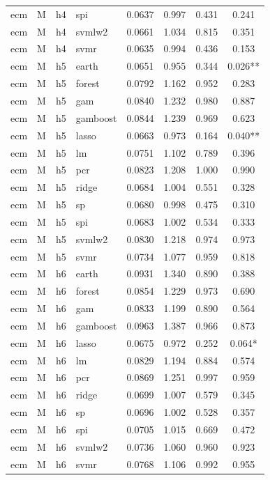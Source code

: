 \begin{ThreePartTable}
\begin{longtable}[t]{llclcccc}
ecm & M & h4 & spi & 0.0637 & 0.997 & 0.431 & 0.241\\
ecm & M & h4 & svmlw2 & 0.0661 & 1.034 & 0.815 & 0.351\\
ecm & M & h4 & svmr & 0.0635 & 0.994 & 0.436 & 0.153\\
\addlinespace
ecm & M & h5 & earth & 0.0651 & 0.955 & 0.344 & 0.026**\\
ecm & M & h5 & forest & 0.0792 & 1.162 & 0.952 & 0.283\\
ecm & M & h5 & gam & 0.0840 & 1.232 & 0.980 & 0.887\\
ecm & M & h5 & gamboost & 0.0844 & 1.239 & 0.969 & 0.623\\
ecm & M & h5 & lasso & 0.0663 & 0.973 & 0.164 & 0.040**\\
ecm & M & h5 & lm & 0.0751 & 1.102 & 0.789 & 0.396\\
ecm & M & h5 & pcr & 0.0823 & 1.208 & 1.000 & 0.990\\
ecm & M & h5 & ridge & 0.0684 & 1.004 & 0.551 & 0.328\\
ecm & M & h5 & sp & 0.0680 & 0.998 & 0.475 & 0.310\\
ecm & M & h5 & spi & 0.0683 & 1.002 & 0.534 & 0.333\\
ecm & M & h5 & svmlw2 & 0.0830 & 1.218 & 0.974 & 0.973\\
ecm & M & h5 & svmr & 0.0734 & 1.077 & 0.959 & 0.818\\
\addlinespace
ecm & M & h6 & earth & 0.0931 & 1.340 & 0.890 & 0.388\\
ecm & M & h6 & forest & 0.0854 & 1.229 & 0.973 & 0.690\\
ecm & M & h6 & gam & 0.0833 & 1.199 & 0.890 & 0.564\\
ecm & M & h6 & gamboost & 0.0963 & 1.387 & 0.966 & 0.873\\
ecm & M & h6 & lasso & 0.0675 & 0.972 & 0.252 & 0.064*\\
ecm & M & h6 & lm & 0.0829 & 1.194 & 0.884 & 0.574\\
ecm & M & h6 & pcr & 0.0869 & 1.251 & 0.997 & 0.959\\
ecm & M & h6 & ridge & 0.0699 & 1.007 & 0.579 & 0.345\\
ecm & M & h6 & sp & 0.0696 & 1.002 & 0.528 & 0.357\\
ecm & M & h6 & spi & 0.0705 & 1.015 & 0.669 & 0.472\\
ecm & M & h6 & svmlw2 & 0.0736 & 1.060 & 0.960 & 0.923\\
ecm & M & h6 & svmr & 0.0768 & 1.106 & 0.992 & 0.955\\

\end{longtable}
\end{ThreePartTable}

